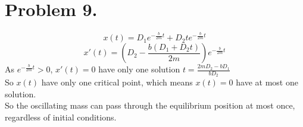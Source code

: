 \documentclass{article}
\begin{document}
\section*{Problem 9.}
	$$x(t)=D_1e^{-\frac{b}{2m}t}+D_2te^{-\frac{b}{2m}t}$$
	$$x'(t)=\left(D_2-\frac{b(D_1+D_2t)}{2m}\right)e^{-\frac{b}{2m}t}$$
	As $e^{-\frac{b}{2m}t}>0$, $x'(t)=0$ have only one solution $t=\frac{2mD_2-bD_1}{bD_2}$\\
	So $x(t)$ have only one critical point, which means $x(t)=0$ have at most one solution.\\
	So the oscillating mass can pass through the equilibrium position at most once, regardless of initial conditions.
\end{document}

